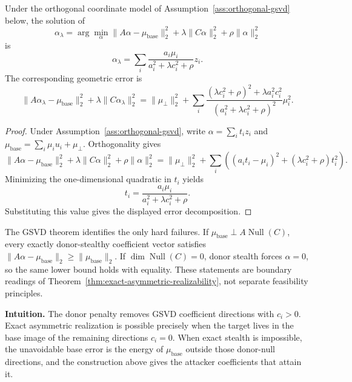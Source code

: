 \begin{lemma}
\label{thm:lambda-regularized-realizability}
Under the orthogonal coordinate model of Assumption~\ref{ass:orthogonal-gsvd} below, the solution of
\[
\alpha_\lambda
=
\arg\min_\alpha
\|A\alpha-\mu_{\text{base}}\|_2^2
+
\lambda\|C\alpha\|_2^2
+
\rho\|\alpha\|_2^2
\]
is
\[
\alpha_\lambda
=
\sum_i
\frac{a_i\mu_i}{a_i^2+\lambda c_i^2+\rho}z_i.
\]
The corresponding geometric error is
\[
\|A\alpha_\lambda-\mu_{\text{base}}\|_2^2
+
\lambda\|C\alpha_\lambda\|_2^2
=
\|\mu_\perp\|_2^2
+
\sum_i
\frac{(\lambda c_i^2+\rho)^2+\lambda a_i^2c_i^2}{(a_i^2+\lambda c_i^2+\rho)^2}\mu_i^2.
\]
\end{lemma}

\begin{proof}
Under Assumption~\ref{ass:orthogonal-gsvd}, write $\alpha=\sum_i t_i z_i$ and $\mu_{\text{base}}=\sum_i\mu_i u_i+\mu_\perp$. Orthogonality gives
\[
\|A\alpha-\mu_{\text{base}}\|_2^2
+
\lambda\|C\alpha\|_2^2
+
\rho\|\alpha\|_2^2
=
\|\mu_\perp\|_2^2+
\sum_i\left((a_it_i-\mu_i)^2+(\lambda c_i^2+\rho)t_i^2\right).
\]
Minimizing the one-dimensional quadratic in $t_i$ yields
\[
t_i=\frac{a_i\mu_i}{a_i^2+\lambda c_i^2+\rho}.
\]
Substituting this value gives the displayed error decomposition.
\end{proof}

\begin{remark}
\label{thm:asymmetric-failure-conditions}
The GSVD theorem identifies the only hard failures. If $\mu_{\text{base}}\perp A\operatorname{Null}(C)$, every exactly donor-stealthy coefficient vector satisfies $\|A\alpha-\mu_{\text{base}}\|_2\ge \|\mu_{\text{base}}\|_2$. If $\dim\operatorname{Null}(C)=0$, donor stealth forces $\alpha=0$, so the same lower bound holds with equality. These statements are boundary readings of Theorem~\ref{thm:exact-asymmetric-realizability}, not separate feasibility principles.
\end{remark}

\noindent\textbf{Intuition.}
The donor penalty removes GSVD coefficient directions with $c_i>0$. Exact asymmetric realization is possible precisely when the target lives in the base image of the remaining directions $c_i=0$. When exact stealth is impossible, the unavoidable base error is the energy of $\mu_{\text{base}}$ outside those donor-null directions, and the construction above gives the attacker coefficients that attain it.

